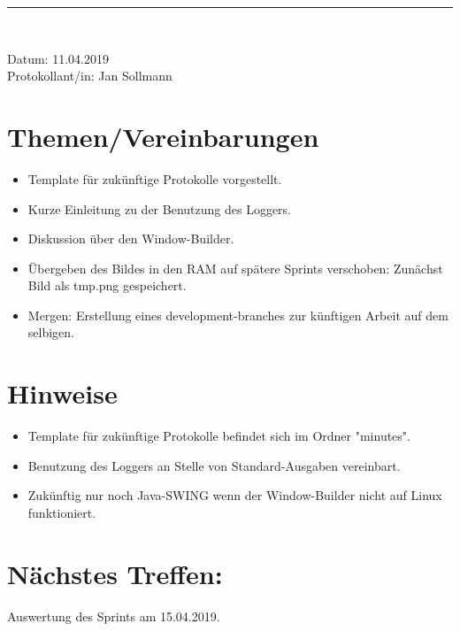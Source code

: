 \pagebreak
\begin{center}  
	\vspace{0.5pt}\nointerlineskip\rule{\textwidth}{0.2pt}\\ 
	\vspace{0.5pt}\nointerlineskip
\end{center} 
\large Datum: 11.04.2019\vspace{3pt}\\\large Protokollant/in: Jan Sollmann
\section{Themen/Vereinbarungen}
\begin{itemize}
	\item Template für zukünftige Protokolle vorgestellt.
	\item Kurze Einleitung zu der Benutzung des Loggers.
	\item Diskussion über den Window-Builder.
	\item Übergeben des Bildes in den RAM auf spätere Sprints verschoben: Zunächst Bild als tmp.png gespeichert.
	\item Mergen: Erstellung eines development-branches zur künftigen Arbeit auf dem selbigen.
\end{itemize}
\section{Hinweise}
\begin{itemize}
	\item Template für zukünftige Protokolle befindet sich im Ordner "minutes".
	\item Benutzung des Loggers an Stelle von Standard-Ausgaben vereinbart.
	\item Zukünftig nur noch Java-SWING wenn der Window-Builder nicht auf Linux funktioniert.
\end{itemize}
\section*{Nächstes Treffen:}
Auswertung des Sprints am 15.04.2019.
